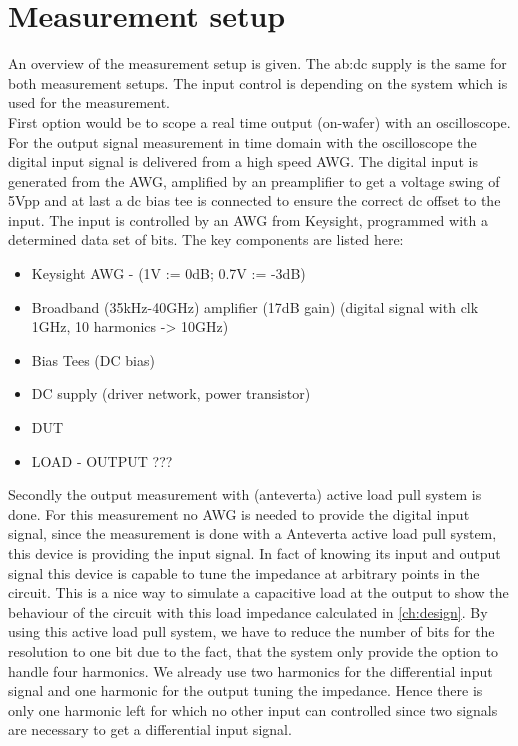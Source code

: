 \section{Measurement setup}
An overview of the measurement setup is given. 
The \gls{ab:dc} supply is the same for both measurement setups.
The input control is depending on the system which is used for the measurement.\\
First option would be to scope a real time output (on-wafer) with an oscilloscope.
For the output signal measurement in time domain with the oscilloscope the digital input signal is delivered from a high speed AWG.
The digital input is generated from the AWG, amplified by an preamplifier to get a voltage swing of 5Vpp and at last a dc bias tee is connected to ensure the correct dc offset to the input.
 The input is controlled by an AWG from Keysight, programmed with a determined data set of bits. The key components are listed here:
\begin{itemize}
	\item Keysight AWG - (1V := 0dB; 0.7V := -3dB)
	\item Broadband (35kHz-40GHz) amplifier (17dB gain) (digital signal with clk 1GHz, 10 harmonics -> 10GHz)
	\item Bias Tees (DC bias)
	\item DC supply (driver network, power transistor)
	\item DUT
	\item LOAD - OUTPUT ???
\end{itemize}

Secondly the output measurement with (anteverta) active load pull system is done.
For this measurement no AWG is needed to provide the digital input signal, since the measurement is done with a Anteverta active load pull system, this device is providing the input signal.
In fact of knowing its input and output signal this device is capable to tune the impedance at arbitrary points in the circuit.
This is a nice way to simulate a capacitive load at the output to show the behaviour of the circuit with this load impedance calculated in \ref{ch:design}.
By using this active load pull system, we have to reduce the number of bits for the resolution to one bit due to the fact, that the system only provide the option to handle four harmonics. 
We already use two harmonics for the differential input signal and one harmonic for the output tuning the impedance. 
Hence there is only one harmonic left for which no other input can controlled since two signals are necessary to get a differential input signal.
